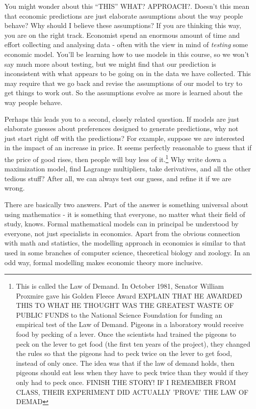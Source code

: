 \documentclass[12pt]{article}
\newcommand{\tmem}[1]{\textit{#1}}
\begin{document}
You might wonder about this "`THIS"' WHAT? APPROACH?. Doesn't this mean that economic predictions are
just elaborate assumptions about the way people behave? Why should I believe
these assumptions? If you are thinking this way, you are on the right track.
Economist spend an enormous amount of time and effort collecting and analysing
data - often with the view in mind of {\tmem{testing}} some economic model.
You'll be learning how to use models in this course, so we won't say much more
about testing, but we might find that our prediction is inconsistent with what
appears to be going on in the data we have collected. This may require that we
go back and revise the assumptions of our model to try to get things to work
out. So the assumptions evolve as more is learned about the way people behave.

Perhaps this leads you to a second, closely related question. If models are
just elaborate guesses about preferences designed to generate predictions, why
not just start right off with the predictions? For example, suppose we are
interested in the impact of an increase in price. It seems perfectly
reasonable to guess that if the price of good rises, then people will buy less
of it.{\footnote{This is called the Law of Demand. In October 1981, Senator
William Proxmire gave his Golden Fleece Award EXPLAIN THAT HE AWARDED THIS TO WHAT HE THOUGHT WAS THE GREATEST WASTE OF PUBLIC FUNDS to the National Science
Foundation for funding an empirical test of the Law of Demand. Pigeons in a
laboratory would receive food by pecking of a lever. Once the scientists had
trained the pigeons to peck on the lever to get food (the first ten years of
the project), they changed the rules so that the pigeons had to peck twice on
the lever to get food, instead of only once. The idea was that if the law of
demand holds, then pigeons should eat less when they have to peck twice than
they would if they only had to peck once. FINISH THE STORY!  IF I REMEMBER FROM CLASS, THEIR EXPERIMENT DID ACTUALLY 'PROVE' THE LAW OF DEMAD }} Why write down a maximization
model, find Lagrange multipliers, take derivatives, and all the other tedious
stuff? After all, we can always test our guess, and refine it if we are wrong.

There are basically two answers. Part of the answer is something universal
about using mathematics - it is something that everyone, no matter what their
field of study, knows. Formal mathematical models can in principal be
understood by everyone, not just specialists in economics. Apart from the
obvious connection with math and statistics, the modelling approach in
economics is similar to that used in some branches of computer science,
theoretical biology and zoology. In an odd way, formal modelling makes
economic theory more inclusive.
\end{document}
